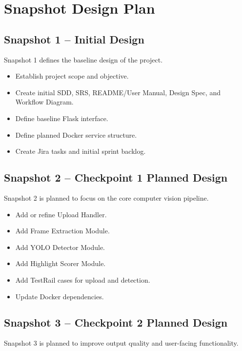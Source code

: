 \documentclass[12pt]{article}
\begin{document}
\section{Snapshot Design Plan}

\subsection{Snapshot 1 -- Initial Design}
Snapshot 1 defines the baseline design of the project.

\begin{itemize}[noitemsep]
    \item Establish project scope and objective.
    \item Create initial SDD, SRS, README/User Manual, Design Spec, and Workflow Diagram.
    \item Define baseline Flask interface.
    \item Define planned Docker service structure.
    \item Create Jira tasks and initial sprint backlog.
\end{itemize}

\subsection{Snapshot 2 -- Checkpoint 1 Planned Design}
Snapshot 2 is planned to focus on the core computer vision pipeline.

\begin{itemize}[noitemsep]
    \item Add or refine Upload Handler.
    \item Add Frame Extraction Module.
    \item Add YOLO Detector Module.
    \item Add Highlight Scorer Module.
    \item Add TestRail cases for upload and detection.
    \item Update Docker dependencies.
\end{itemize}

\subsection{Snapshot 3 -- Checkpoint 2 Planned Design}
Snapshot 3 is planned to improve output quality and user-facing functionality.
\end{document}
